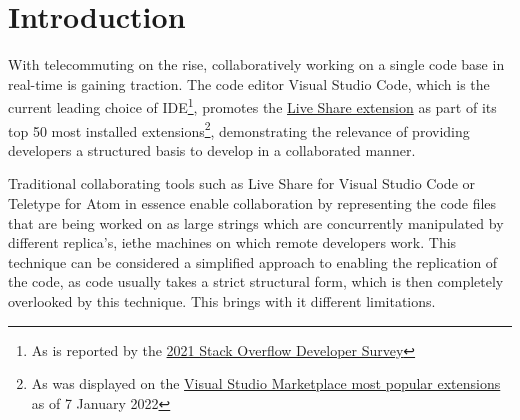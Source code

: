 \section{Introduction}\label{sec:introduction}

With telecommuting on the rise, collaboratively working on a single code base in real-time is gaining traction.
The code editor Visual Studio Code, which is the current leading choice of IDE\footnote{As is reported by the
\href{
    https://insights.stackoverflow.com/survey/2021\#section-most-popular-technologies-integrated-development-environment
}{2021 Stack Overflow Developer Survey}}, promotes the
\href{https://marketplace.visualstudio.com/items?itemName=MS-vsliveshare.vsliveshare}{Live Share extension}
as part of its top 50 most installed extensions\footnote{As was displayed on the
\href{https://marketplace.visualstudio.com/search?target=VSCode\&category=All\%20categories\&sortBy=Installs}
{Visual Studio Marketplace most popular extensions} as of 7 January 2022}, demonstrating the relevance of providing
developers a structured basis to develop in a collaborated manner.

Traditional collaborating tools such as Live Share for Visual Studio Code or Teletype for Atom in essence enable
collaboration by representing the code files that are being worked on as large strings which are concurrently
manipulated by different replica's, ie\. the machines on which remote developers work.
This technique can be considered a simplified approach to enabling the replication of the code, as code usually takes
a strict structural form, which is then completely overlooked by this technique.
This brings with it different limitations.

